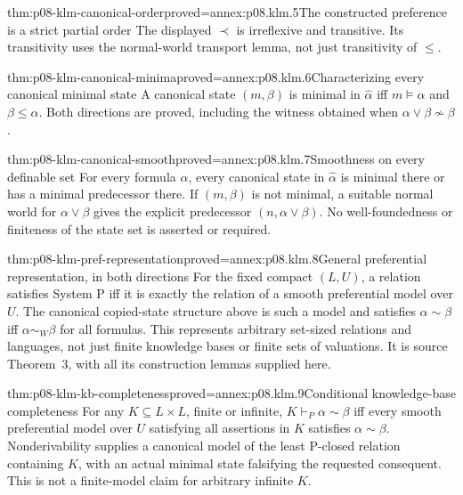 \begin{hblemma}{thm:p08-klm-canonical-order}{proved=annex:p08.klm.5}{The constructed preference is a strict partial order}
The displayed \(\prec\) is irreflexive and transitive. Its transitivity
uses the normal-world transport lemma, not just transitivity of \(\leq\).
\end{hblemma}

\begin{hblemma}{thm:p08-klm-canonical-minima}{proved=annex:p08.klm.6}{Characterizing every canonical minimal state}
A canonical state \((m,\beta)\) is minimal in \(\widehat\alpha\)
iff \(m\models\alpha\) and \(\beta\leq\alpha\).
Both directions are proved, including the witness obtained when
\(\alpha\vee\beta\not\sim\beta\).
\end{hblemma}

\begin{hblemma}{thm:p08-klm-canonical-smooth}{proved=annex:p08.klm.7}{Smoothness on every definable set}
For every formula \(\alpha\), every canonical state in
\(\widehat\alpha\) is minimal there or has a minimal predecessor there.
If \((m,\beta)\) is not minimal, a suitable normal world for
\(\alpha\vee\beta\) gives the explicit predecessor
\((n,\alpha\vee\beta)\). No well-foundedness or finiteness of
the state set is asserted or required.
\end{hblemma}

\begin{hbtheorem}{thm:p08-klm-pref-representation}{proved=annex:p08.klm.8}{General preferential representation, in both directions}
For the fixed compact \((L,U)\), a relation satisfies System P iff
it is exactly the relation of a smooth preferential model over \(U\).
The canonical copied-state structure above is such a model and satisfies
\(\alpha\sim\beta\) iff \(\alpha\sim_W\beta\) for all formulas.
This represents arbitrary set-sized relations and languages, not just
finite knowledge bases or finite sets of valuations. It is source
Theorem~3, with all its construction lemmas supplied here.
\end{hbtheorem}

\begin{hbcorollary}{thm:p08-klm-kb-completeness}{proved=annex:p08.klm.9}{Conditional knowledge-base completeness}
For any \(K\subseteq L\times L\), finite or infinite,
\(K\vdash_P\alpha\sim\beta\) iff every smooth preferential model
over \(U\) satisfying all assertions in \(K\) satisfies
\(\alpha\sim\beta\). Nonderivability supplies a canonical model
of the least P-closed relation containing \(K\), with an actual minimal
state falsifying the requested consequent. This is not a finite-model
claim for arbitrary infinite \(K\).
\end{hbcorollary}

